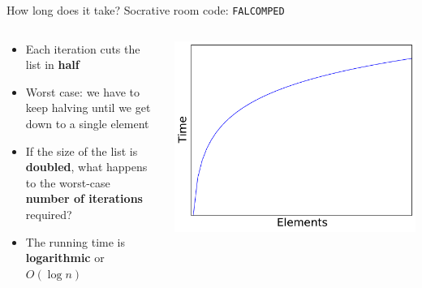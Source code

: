 \fi

\begin{frame}{How long does it take?}
	Socrative room code: \texttt{FALCOMPED}
	\begin{columns}
		\begin{column}{0.55\textwidth}
			\begin{itemize}
				\item Each iteration cuts the list in \textbf{half} \pause
				\item Worst case: we have to keep halving until we get down to a single element \pause
				\item If the size of the list is \textbf{doubled}, what happens to the worst-case
					\textbf{number of iterations} required? \pause
				\iftoggle{printable}{}{\item \textbf{Answer:} it increases by 1 \pause}
				\item The running time is \textbf{logarithmic} or $O(\log n)$ \pause
			\end{itemize}
		\end{column}
		\begin{column}{0.45\textwidth}
			\includegraphics[width=\textwidth]{plot2_log}
		\end{column}
	\end{columns}
\end{frame}

